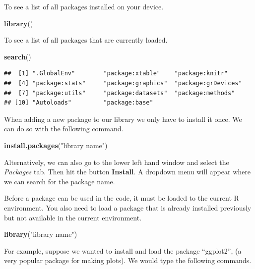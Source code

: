 \documentclass[
]{book}
\newenvironment{Shaded}{\begin{snugshade}}{\end{snugshade}}
\newcommand{\KeywordTok}[1]{\textcolor[rgb]{0.13,0.29,0.53}{\textbf{#1}}}
\newcommand{\NormalTok}[1]{#1}
\newcommand{\StringTok}[1]{\textcolor[rgb]{0.31,0.60,0.02}{#1}}
\begin{document}
To see a list of all packages installed on your device.

\begin{Shaded}
\begin{Highlighting}[]
\KeywordTok{library}\NormalTok{()}
\end{Highlighting}
\end{Shaded}

To see a list of all packages that are currently loaded.

\begin{Shaded}
\begin{Highlighting}[]
\KeywordTok{search}\NormalTok{()}
\end{Highlighting}
\end{Shaded}

\begin{verbatim}
##  [1] ".GlobalEnv"        "package:xtable"    "package:knitr"    
##  [4] "package:stats"     "package:graphics"  "package:grDevices"
##  [7] "package:utils"     "package:datasets"  "package:methods"  
## [10] "Autoloads"         "package:base"
\end{verbatim}

When adding a new package to our library we only have to install it once. We can do so with the following command.

\begin{Shaded}
\begin{Highlighting}[]
\KeywordTok{install.packages}\NormalTok{(}\StringTok{"library name"}\NormalTok{)}
\end{Highlighting}
\end{Shaded}

Alternatively, we can also go to the lower left hand window and select the \emph{Packages} tab. Then hit the button \textbf{Install}. A dropdown menu will appear where we can search for the package name.

Before a package can be used in the code, it must be loaded to the current R environment. You also need to load a package that is already installed previously but not available in the current environment.

\begin{Shaded}
\begin{Highlighting}[]
\KeywordTok{library}\NormalTok{(}\StringTok{"library name"}\NormalTok{)}
\end{Highlighting}
\end{Shaded}

For example, suppose we wanted to install and load the package ``ggplot2'', (a very popular package for making plots). We would type the following commands.
\end{document}
